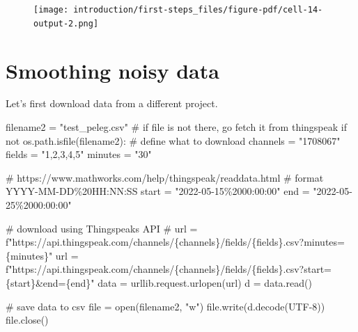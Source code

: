 \documentclass[
  letterpaper,
  DIV=11,
  numbers=noendperiod,
  oneside]{scrreprt}
\newenvironment{Shaded}{\begin{snugshade}}{\end{snugshade}}
\newcommand{\BuiltInTok}[1]{\textcolor[rgb]{0.00,0.23,0.31}{#1}}
\newcommand{\CommentTok}[1]{\textcolor[rgb]{0.37,0.37,0.37}{#1}}
\newcommand{\ControlFlowTok}[1]{\textcolor[rgb]{0.00,0.23,0.31}{#1}}
\newcommand{\KeywordTok}[1]{\textcolor[rgb]{0.00,0.23,0.31}{#1}}
\newcommand{\NormalTok}[1]{\textcolor[rgb]{0.00,0.23,0.31}{#1}}
\newcommand{\OperatorTok}[1]{\textcolor[rgb]{0.37,0.37,0.37}{#1}}
\newcommand{\SpecialCharTok}[1]{\textcolor[rgb]{0.37,0.37,0.37}{#1}}
\newcommand{\SpecialStringTok}[1]{\textcolor[rgb]{0.13,0.47,0.30}{#1}}
\newcommand{\StringTok}[1]{\textcolor[rgb]{0.13,0.47,0.30}{#1}}
\begin{document}
\begin{figure}[H]

{\centering \texttt{[image: introduction/first-steps\_files/figure-pdf/cell-14-output-2.png]}

}

\end{figure}

\hypertarget{smoothing-noisy-data}{%
\section{Smoothing noisy data}\label{smoothing-noisy-data}}

Let's first download data from a different project.

\begin{Shaded}
\begin{Highlighting}[]
\NormalTok{filename2 }\OperatorTok{=} \StringTok{"test\_peleg.csv"}
\CommentTok{\# if file is not there, go fetch it from thingspeak}
\ControlFlowTok{if} \KeywordTok{not}\NormalTok{ os.path.isfile(filename2):}
    \CommentTok{\# define what to download}
\NormalTok{    channels }\OperatorTok{=} \StringTok{"1708067"}
\NormalTok{    fields }\OperatorTok{=} \StringTok{"1,2,3,4,5"}
\NormalTok{    minutes }\OperatorTok{=} \StringTok{"30"}

    \CommentTok{\# https://www.mathworks.com/help/thingspeak/readdata.html}
    \CommentTok{\# format YYYY{-}MM{-}DD\%20HH:NN:SS}
\NormalTok{    start }\OperatorTok{=} \StringTok{"2022{-}05{-}15\%2000:00:00"}
\NormalTok{    end }\OperatorTok{=} \StringTok{"2022{-}05{-}25\%2000:00:00"}

    \CommentTok{\# download using Thingspeak\textquotesingle{}s API}
    \CommentTok{\# url = f"https://api.thingspeak.com/channels/\{channels\}/fields/\{fields\}.csv?minutes=\{minutes\}"}
\NormalTok{    url }\OperatorTok{=} \SpecialStringTok{f"https://api.thingspeak.com/channels/}\SpecialCharTok{\{}\NormalTok{channels}\SpecialCharTok{\}}\SpecialStringTok{/fields/}\SpecialCharTok{\{}\NormalTok{fields}\SpecialCharTok{\}}\SpecialStringTok{.csv?start=}\SpecialCharTok{\{}\NormalTok{start}\SpecialCharTok{\}}\SpecialStringTok{\&end=}\SpecialCharTok{\{}\NormalTok{end}\SpecialCharTok{\}}\SpecialStringTok{"}
\NormalTok{    data }\OperatorTok{=}\NormalTok{ urllib.request.urlopen(url)}
\NormalTok{    d }\OperatorTok{=}\NormalTok{ data.read()}

    \CommentTok{\# save data to csv}
    \BuiltInTok{file} \OperatorTok{=} \BuiltInTok{open}\NormalTok{(filename2, }\StringTok{"w"}\NormalTok{)}
    \BuiltInTok{file}\NormalTok{.write(d.decode(}\StringTok{\textquotesingle{}UTF{-}8\textquotesingle{}}\NormalTok{))}
    \BuiltInTok{file}\NormalTok{.close()}
\end{Highlighting}
\end{Shaded}
\end{document}
